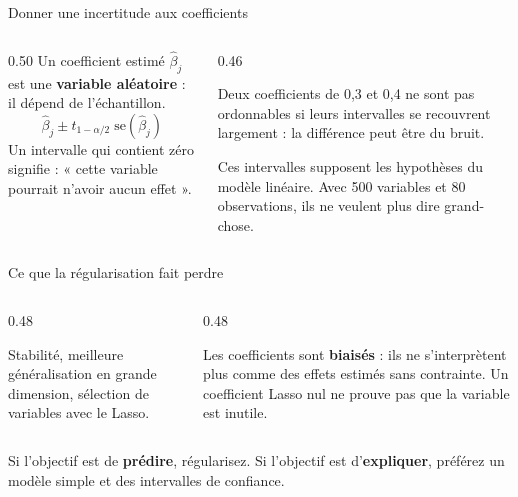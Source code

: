 \begin{frame}{Donner une incertitude aux coefficients}
\begin{columns}[t]
\begin{column}{0.50\textwidth}
Un coefficient estimé $\hat\beta_j$ est une \textbf{variable aléatoire} : il
dépend de l'échantillon.
\[
  \hat\beta_j \pm t_{1-\alpha/2}\;\mathrm{se}(\hat\beta_j)
\]
Un intervalle qui contient zéro signifie : « cette variable pourrait n'avoir
aucun effet ».
\end{column}
\begin{column}{0.46\textwidth}
\begin{kbox}
Deux coefficients de 0,3 et 0,4 ne sont pas ordonnables si leurs intervalles se
recouvrent largement : la différence peut être du bruit.
\end{kbox}
\begin{wbox}[Limite]
Ces intervalles supposent les hypothèses du modèle linéaire. Avec 500 variables
et 80 observations, ils ne veulent plus dire grand-chose.
\end{wbox}
\end{column}
\end{columns}
\end{frame}

\begin{frame}{Ce que la régularisation fait perdre}
\begin{columns}[t]
\begin{column}{0.48\textwidth}
\begin{ebox}
Stabilité, meilleure généralisation en grande dimension, sélection de variables
avec le Lasso.
\end{ebox}
\end{column}
\begin{column}{0.48\textwidth}
\begin{wbox}
Les coefficients sont \textbf{biaisés} : ils ne s'interprètent plus comme des
effets estimés sans contrainte. Un coefficient Lasso nul ne prouve pas que la
variable est inutile.
\end{wbox}
\end{column}
\end{columns}
\vspace{2mm}
\begin{kbox}
Si l'objectif est de \textbf{prédire}, régularisez. Si l'objectif est
d'\textbf{expliquer}, préférez un modèle simple et des intervalles de confiance.
\end{kbox}
\end{frame}

